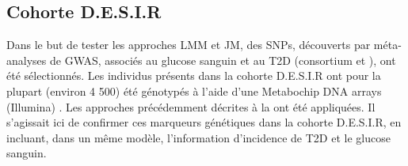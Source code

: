 \documentclass[11pt, a4paper]{article}
\begin{document}
\subsection{Cohorte D.E.S.I.R}
\par{Dans le but de tester les approches LMM et JM, des SNPs, découverts par méta-analyses de GWAS, associés
au glucose sanguin et au T2D (consortium \citeauthor{diagram_consortium} et \citeauthor{magic_consortium}), ont été sélectionnés.
Les individus présents dans la cohorte D.E.S.I.R ont pour la plupart (environ 4 500) été génotypés
à l’aide d’une Metabochip DNA arrays (Illumina) \citep{voight_metabochip_2012}.
Les approches précédemment décrites à la  ont été appliquées.
Il s’agissait ici de confirmer ces marqueurs génétiques dans la cohorte D.E.S.I.R, en incluant, dans un même modèle,
l'information d'incidence de T2D et le glucose sanguin.}
\setlength{\tabcolsep}{5pt}
\end{document}
